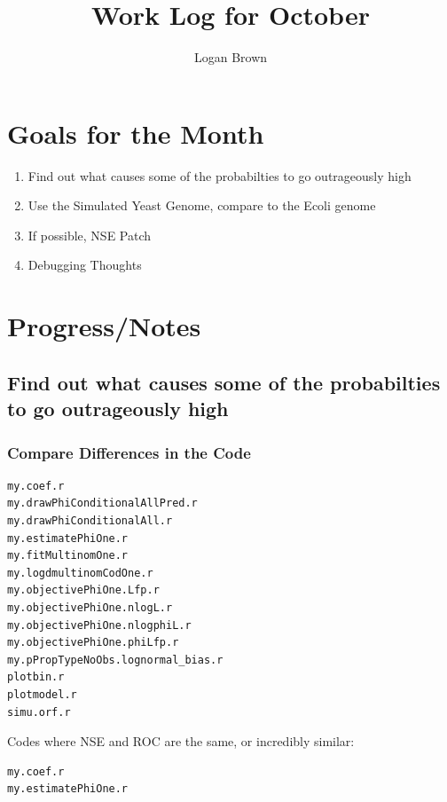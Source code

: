 
\usepackage{pdfpages}

\title{Work Log for October}
\author{Logan Brown}



\maketitle
\tableofcontents

\newpage


\section{Goals for the Month}
\begin{enumerate}
\item Find out what causes some of the probabilties to go outrageously high
\item Use the Simulated Yeast Genome, compare to the Ecoli genome
\item If possible, NSE Patch
\item Debugging Thoughts
\end{enumerate}

\section{Progress/Notes}

\subsection{Find out what causes some of the probabilties to go outrageously high}

\subsubsection{Compare Differences in the Code}
\begin{verbatim}
my.coef.r
my.drawPhiConditionalAllPred.r
my.drawPhiConditionalAll.r
my.estimatePhiOne.r
my.fitMultinomOne.r
my.logdmultinomCodOne.r
my.objectivePhiOne.Lfp.r
my.objectivePhiOne.nlogL.r
my.objectivePhiOne.nlogphiL.r
my.objectivePhiOne.phiLfp.r
my.pPropTypeNoObs.lognormal_bias.r
plotbin.r
plotmodel.r
simu.orf.r
\end{verbatim}


Codes where NSE and ROC are the same, or incredibly similar:
\begin{verbatim}
my.coef.r
my.estimatePhiOne.r
\end{verbatim}

